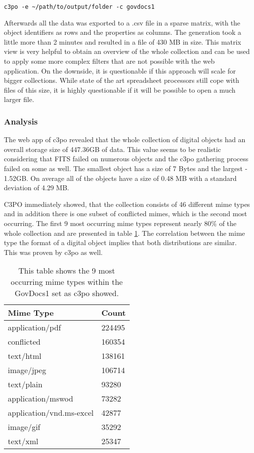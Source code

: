 
\begin{verbatim}
c3po -e ~/path/to/output/folder -c govdocs1
\end{verbatim}
Afterwards all the data was exported to a .csv file in a sparse matrix, with the object identifiers as rows and the properties as columns. The generation took a little more than 2 minutes and resulted in a file of 430 MB in size. This matrix view is very helpful to obtain an overview of the whole collection and can be used to apply some more complex filters that are not possible with the web application. On the downside, it is questionable if this approach will scale for bigger collections. While state of the art spreadsheet processors still cope with files of this size, it is highly questionable if it will be possible to open a much larger file.

\subsubsection{Analysis}
The web app of c3po revealed that the whole collection of digital objects had an overall storage size of 447.36GB of data. This value seems to be realistic considering that FITS failed on numerous objects and the c3po gathering process failed on some as well. The smallest object has a size of 7 Bytes and the largest - 1.52GB. On average all of the objects have a size of 0.48 MB with a standard deviation of 4.29 MB.

C3PO immediately showed, that the collection consists of 46 different mime types and in addition there is one subset of conflicted mimes, which is the second most occurring. The first 9 most occurring mime types represent nearly 80\% of the whole collection and are presented in table \ref{tab:govdocs1_mimetypes}. The correlation between the mime type the format of a digital object implies that both distributions are similar. This was proven by c3po as well.


\begin{table}[h]
\centering
\begin{tabular}{l || l }
\hline
Mime Type & Count \\
\hline
\hline
 application/pdf & 224495 \\
 conflicted 	& 160354 \\
 text/html		&  138161 \\
 image/jpeg	&  106714 \\
 text/plain		& 93280 \\
 application/mswod & 73282 \\
 application/vnd.ms-excel & 42877 \\
 image/gif		& 35292 \\
 text/xml		& 25347\\
 \hline
\end{tabular}
\caption{This table shows the 9 most occurring mime types within the GovDocs1 set as c3po showed.}
\label{tab:govdocs1_mimetypes}
\end{table}


